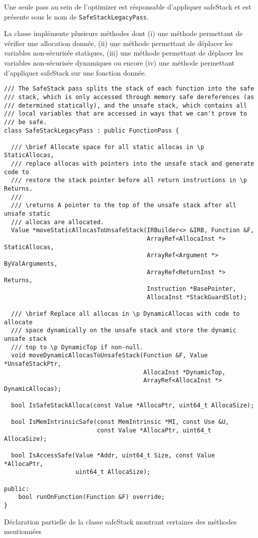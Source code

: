 Une seule \og pass \fg au sein de l'\og optimizer \fg est résponsable d'appliquer \og \gls{safeStack} \fg et est présente sous le nom de \texttt{SafeStackLegacyPass}.

La classe implémente plusieurs méthodes dont (i) une méthode permettant de vérifier une allocation donnée, (ii) une méthode permettant de déplacer les variables non-sécurisée statiques, (iii) une méthode permettant de déplacer les variables non-sécurisée dynamiques ou encore (iv) une méthode permettant d'appliquer \og \gls{safeStack} \fg sur une fonction donnée.

\newpage

\begin{listing}
	\begin{verbatim}
/// The SafeStack pass splits the stack of each function into the safe
/// stack, which is only accessed through memory safe dereferences (as
/// determined statically), and the unsafe stack, which contains all
/// local variables that are accessed in ways that we can't prove to
/// be safe.
class SafeStackLegacyPass : public FunctionPass {

  /// \brief Allocate space for all static allocas in \p StaticAllocas,
  /// replace allocas with pointers into the unsafe stack and generate code to
  /// restore the stack pointer before all return instructions in \p Returns.
  ///
  /// \returns A pointer to the top of the unsafe stack after all unsafe static
  /// allocas are allocated.
  Value *moveStaticAllocasToUnsafeStack(IRBuilder<> &IRB, Function &F,
                                        ArrayRef<AllocaInst *> StaticAllocas,
                                        ArrayRef<Argument *> ByValArguments,
                                        ArrayRef<ReturnInst *> Returns,
                                        Instruction *BasePointer,
                                        AllocaInst *StackGuardSlot);

  /// \brief Replace all allocas in \p DynamicAllocas with code to allocate
  /// space dynamically on the unsafe stack and store the dynamic unsafe stack
  /// top to \p DynamicTop if non-null.
  void moveDynamicAllocasToUnsafeStack(Function &F, Value *UnsafeStackPtr,
                                       AllocaInst *DynamicTop,
                                       ArrayRef<AllocaInst *> DynamicAllocas);

  bool IsSafeStackAlloca(const Value *AllocaPtr, uint64_t AllocaSize);

  bool IsMemIntrinsicSafe(const MemIntrinsic *MI, const Use &U,
                          const Value *AllocaPtr, uint64_t AllocaSize);

  bool IsAccessSafe(Value *Addr, uint64_t Size, const Value *AllocaPtr,
                    uint64_t AllocaSize);

public:
	bool runOnFunction(Function &F) override;
}
	\end{verbatim}
	\caption{Déclaration partielle de la classe \og \gls{safeStack} \fg montrant certaines des méthodes mentionnées}
	\label{lst:SafeStackLegacyPassClass}
\end{listing}

